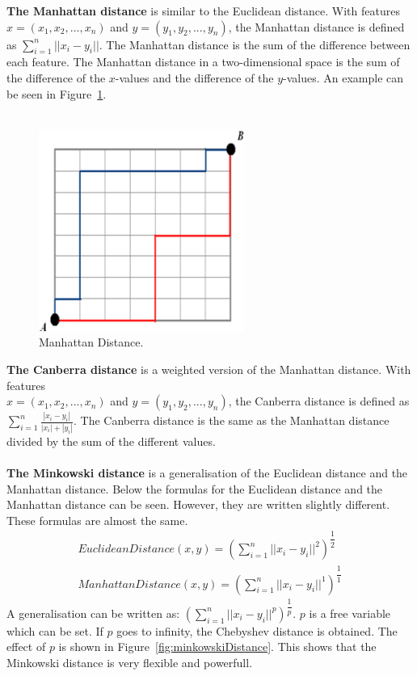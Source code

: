 \noindent \textbf{The Manhattan distance} is similar to the Euclidean distance. With features $x = (x_1, x_2,..., x_n)$ and $y = (y_1, y_2,..., y_n)$, the Manhattan distance is defined as $\sum_{i=1}^{n}||x_i-y_i||$. The Manhattan distance is the sum of the difference between each feature. \cite{manhattanDistance} The Manhattan distance in a two-dimensional space is the sum of the difference of the $x$-values and the difference of the $y$-values. An example can be seen in Figure~\ref{fig:manhattanDistance}. \\\\

\begin{figure}[H]
\centering
\includegraphics[width=0.6\textwidth]{Figures/manhattanDistance}
\decoRule
\caption[Manhattan Distance]{Manhattan Distance. \cite{manhattanDistance}}
\label{fig:manhattanDistance}
\end{figure}

\noindent \textbf{The Canberra distance} is a weighted version of the Manhattan distance. With features\\ $x = (x_1, x_2,..., x_n)$ and $y = (y_1, y_2,..., y_n)$, the Canberra distance is defined as $\sum_{i=1}^{n}\frac{| x_i - y_i |}{ |x_i| + |y_i|}$. The Canberra distance is the same as the Manhattan distance divided by the sum of the different values. \cite{canberraDistance} \\
\\
\noindent \textbf{The Minkowski distance} is a generalisation of the Euclidean distance and the Manhattan distance. Below the formulas for the Euclidean distance and the Manhattan distance can be seen. However, they are written slightly different. These formulas are almost the same.
\begin{align}
EuclideanDistance(x, y) = (\sum_{i=1}^{n}||x_i-y_i||^2)^{\dfrac{1}{2}} \\
ManhattanDistance(x, y) = (\sum_{i=1}^{n}||x_i-y_i||^1)^{\dfrac{1}{1}}
\end{align}
\noindent A generalisation can be written as: $(\sum_{i=1}^{n}||x_i-y_i||^p)^{\dfrac{1}{p}}$. $p$ is a free variable which can be set. If $p$ goes to infinity, the Chebyshev distance is obtained. The effect of $p$ is shown in Figure~\ref{fig:minkowskiDistance}. This shows that the Minkowski distance is very flexible and powerfull. \cite{minkowskiDistanceExplain} \\\\

